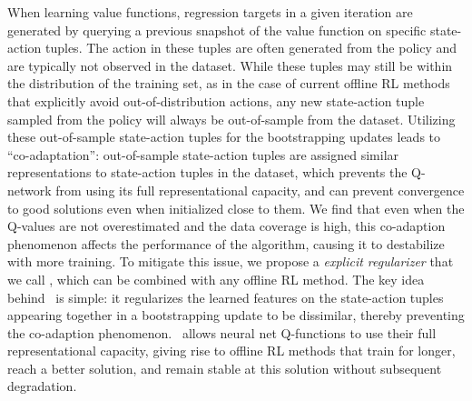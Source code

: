 When learning value functions, regression targets in a given iteration are generated by querying a previous snapshot of the value function on specific state-action tuples. The action in these tuples  are often generated from the policy
and are typically not observed in the dataset. While these tuples may still be within the distribution of the training set, as in the case of current offline RL methods that explicitly avoid out-of-distribution actions,
any new state-action tuple sampled from the policy will always be out-of-sample from the dataset.   
Utilizing these out-of-sample state-action tuples for the bootstrapping updates leads to ``co-adaptation'': out-of-sample  state-action tuples are assigned similar representations to state-action tuples in the dataset, which prevents the Q-network from using its full representational capacity, and can prevent convergence to good solutions even when initialized close to them. We find that even when the Q-values are not overestimated and the data coverage is high, this co-adaption phenomenon affects the performance of the algorithm, causing it to destabilize with more training. 
To mitigate this issue, we propose a \emph{explicit regularizer} that we call \methodname, which can be combined with any offline RL method.
The key idea behind \methodname\ is simple: it regularizes the learned features on the state-action tuples appearing together in a bootstrapping update to be dissimilar, thereby preventing the co-adaption phenomenon. \methodname\ allows neural net Q-functions to use their full representational capacity, giving rise to offline RL methods that train for longer, reach a better solution, and remain stable at this solution without subsequent degradation.

